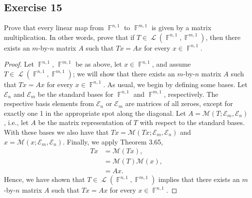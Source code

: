 \documentclass[letterpaper, 12pt]{amsart}
\DeclareMathOperator{\F}{\mathbb{F}}
\DeclareMathOperator{\Ell}{\mathscr{L}}
\theoremstyle{definition}  %
\begin{document}
		\subsection*{Exercise 15}
		Prove that every linear map from $\F^{n,1}$ to $\F^{m,1}$ is given by a matrix multiplication. 
		In other words, prove that if $T \in \Ell(\F^{n,1}, \F^{m,1})$, then there exists an $m$-by-$n$ matrix $A$ such that $Tx = Ax$ for every $x \in \F^{n,1}$.
		
		\begin{proof}
		Let $\F^{n,1}$, $\F^{m,1}$ be as above, let $x \in \F^{n,1}$, and assume $T \in \Ell(\F^{n,1}, \F^{m,1})$; we will show that there exists an $m$-by-$n$ matrix $A$ such that $Tx = Ax$ for every $x \in \F^{n,1}$.
		As usual, we begin by defining some bases.
		Let $\mathcal{E}_{n}$ and $\mathcal{E}_{m}$ be the standard bases for $\F^{n,1}$ and $\F^{m,1}$, respectively.
		The respective basis elements from $\mathcal{E}_{n}$ or $\mathcal{E}_{m}$ are matrices of all zeroes, except for exactly one 1 in the appropriate spot along the diagonal.
		Let $A = \mathcal{M}(T;\mathcal{E}_{m},\mathcal{E}_{n})$, i.e., let $A$ be the matrix representation of $T$ with respect to the standard bases.
		With these bases we also have that $Tx = \mathcal{M}(Tx; \mathcal{E}_{m},\mathcal{E}_{n})$ and $x = \mathcal{M}(x;\mathcal{E}_{m},\mathcal{E}_{n})$.
		Finally, we apply Theorem 3.65,
			\begin{align*}
				Tx &= \mathcal{M}(Tx), \\
				&= \mathcal{M}(T)\mathcal{M}(x), \\
				&= Ax.
			\end{align*}
		Hence, we have shown that $T \in \Ell(\F^{n,1}, \F^{m,1})$ implies that there exists an $m$-by-$n$ matrix $A$ such that $Tx = Ax$ for every $x \in \F^{n,1}$.
		\end{proof}
\end{document}
